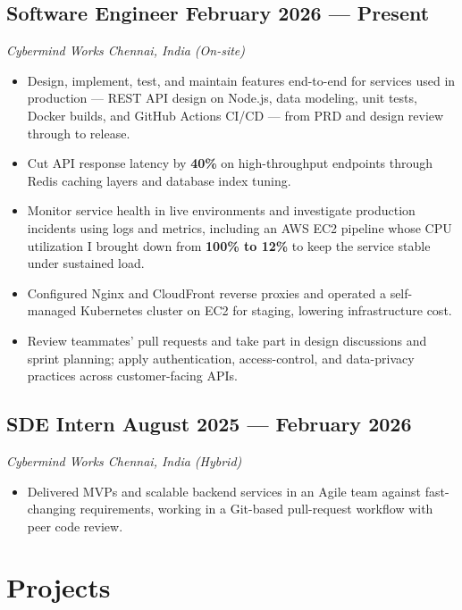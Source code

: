 \documentclass[letter,10pt]{article}
\newcommand{\subtext}[1]{\textit{#1}\par\vspace{-.75em}}
\newenvironment{zitemize}{%
\begin{itemize} \itemsep 0pt \parskip 0pt \parsep 1pt}
{\end{itemize}\vspace{-.5em}}
\begin{document}
\subsection{{Software Engineer \hfill February 2026 --- Present}}
\subtext{Cybermind Works \hfill Chennai, India (On-site)}
\begin{zitemize}
\item Design, implement, test, and maintain features end-to-end for services used in production --- REST API design on Node.js, data modeling, unit tests, Docker builds, and GitHub Actions CI/CD --- from PRD and design review through to release.
\item Cut API response latency by \textbf{40\%} on high-throughput endpoints through Redis caching layers and database index tuning.
\item Monitor service health in live environments and investigate production incidents using logs and metrics, including an AWS EC2 pipeline whose CPU utilization I brought down from \textbf{100\% to 12\%} to keep the service stable under sustained load.
\item Configured Nginx and CloudFront reverse proxies and operated a self-managed Kubernetes cluster on EC2 for staging, lowering infrastructure cost.
\item Review teammates' pull requests and take part in design discussions and sprint planning; apply authentication, access-control, and data-privacy practices across customer-facing APIs.
\end{zitemize}

\subsection{{SDE Intern \hfill August 2025 --- February 2026}}
\subtext{Cybermind Works \hfill Chennai, India (Hybrid)}
\begin{zitemize}
\item Delivered MVPs and scalable backend services in an Agile team against fast-changing requirements, working in a Git-based pull-request workflow with peer code review.
\end{zitemize}

\section{Projects}
\end{document}
